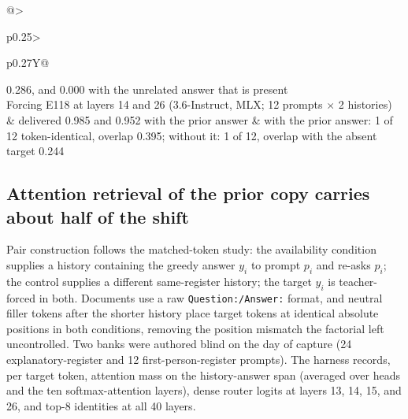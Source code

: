 \documentclass[10pt,a4paper,twocolumn]{article}
\begin{document}
\begin{table}[!t]
\begin{tabularx}{\textwidth}{@{}>{\raggedright\arraybackslash}p{}>{\raggedright\arraybackslash}p{}Y@{}}
0.286, and 0.000 with the unrelated answer that is present \\
Forcing E118 at layers 14 and 26 (3.6-Instruct, MLX; 12 prompts
\(\times\) 2 histories)
& delivered 0.985 and 0.952 with the prior answer
& with the prior answer: 1 of 12 token-identical, overlap 0.395; without
it: 1 of 12, overlap with the absent target 0.244 \\
\bottomrule
\end{tabularx}
\caption{\textbf{Mechanism, replication, and intervention summary.} 3.5-Base is
Qwen3.5-35B-A3B-Base; 3.6-Instruct is instruction-tuned Qwen3.6-35B-A3B.
Bootstrap CIs use 10,000 prompt-cluster resamples (seed 299792). Selection
frequency is the share of scored tokens at which the expert is among the eight
selected; Jaccard is the intersection over union of two top-8 sets; copy
fraction is defined in Section~\ref{sec:methods}. The intervention rows
replace the version 1.0--1.1 rows, which are withdrawn
(Section~\ref{sec:intervention}); MLX rows use 4-bit weights with 8-bit
router gates, and ``overlap'' is the eight-gram copy fraction against the
prompt's own greedy answer.}
\label{tab:mech}
\end{table}

\subsection{Attention retrieval of the prior copy carries about half of the shift}

Pair construction follows the matched-token study: the availability condition
supplies a history containing the greedy answer \(y_i\) to prompt \(p_i\) and
re-asks \(p_i\); the control supplies a different same-register history; the
target \(y_i\) is teacher-forced in both. Documents use a raw
\texttt{Question:/Answer:} format, and neutral filler tokens after the shorter
history place target tokens at identical absolute positions in both
conditions, removing the position mismatch the factorial left uncontrolled.
Two banks were authored blind on the day of capture (24 explanatory-register
and 12 first-person-register prompts). The harness records, per target token,
attention mass on the history-answer span (averaged over heads and the ten
softmax-attention layers), dense router logits at layers 13, 14, 15, and 26,
and top-8 identities at all 40 layers.
\end{document}

